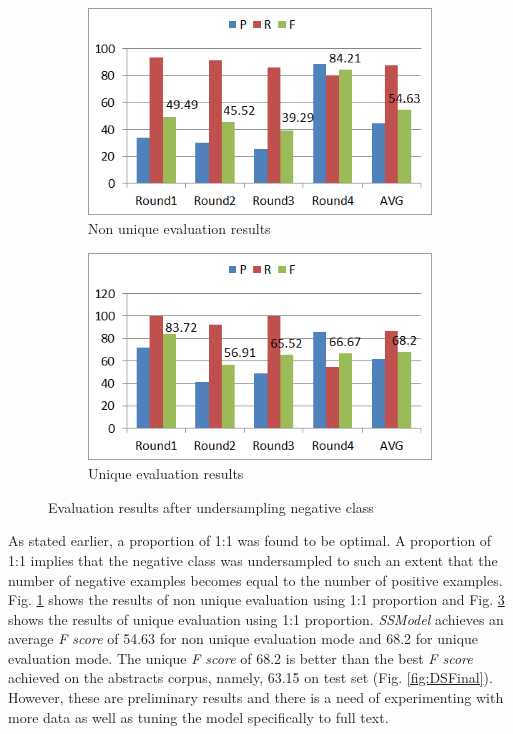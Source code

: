 \begin{figure}
\centering
\begin{subfigure}{.5\textwidth}
  \centering
  \includegraphics[width=.95\linewidth]{figures/4_FTSameRatioResults.png}
  \caption{Non unique evaluation results}
  \label{fig:FT_ResUnderSampNonUniq}
\end{subfigure}%
\begin{subfigure}{.5\textwidth}
  \centering
  \includegraphics[width=.95\linewidth]{figures/4_FTSameRatioResults_Uniq.png}
  \caption{Unique evaluation results}
  \label{fig:FT_ResUnderSampUniq}
\end{subfigure}
\caption{Evaluation results after undersampling negative class}
\end{figure}

As stated earlier, a proportion of 1:1 was found to be optimal. A proportion of 1:1 implies that the negative class was undersampled to such an extent that the number of negative examples becomes equal to the number of positive examples. Fig. \ref{fig:FT_ResUnderSampNonUniq} shows the results of non unique evaluation using 1:1 proportion and Fig. \ref{fig:FT_ResUnderSampUniq} shows the results of unique evaluation using 1:1 proportion. \textit{SSModel} achieves an average \textit{F score} of 54.63 for non unique evaluation mode and 68.2 for unique evaluation mode. The unique \textit{F score} of 68.2 is better than the best \textit{F score} achieved on the abstracts corpus, namely, 63.15 on test set (Fig. \ref{fig:DSFinal}). However, these are preliminary results and there is a need of experimenting with more data as well as tuning the model specifically to full text.


